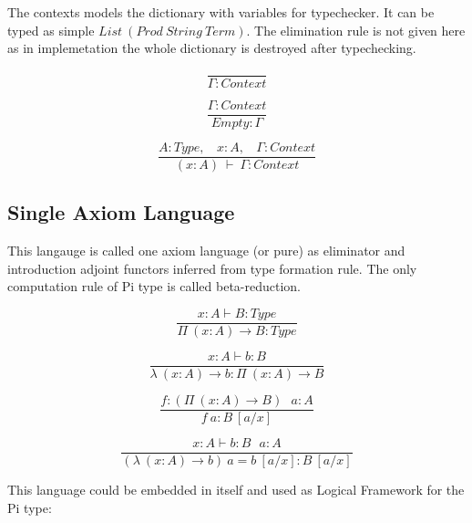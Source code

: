 \documentclass[11pt,oneside]{article}
\begin{document}
The contexts models the dictionary with variables for typechecker.
It can be typed as simple $List\ (Prod\ String\ Term)$. The elimination
rule is not given here as in implemetation the whole dictionary
is destroyed after typechecking.

\begin{equation}
\tag{S}
\dfrac
{}
{\Gamma : Context}
\end{equation}

\begin{equation}
\tag{S}
\dfrac
{\Gamma : Context}
{Empty : \Gamma}
\end{equation}

\begin{equation}
\tag{S}
\dfrac
{A : Type,\ \ \ \ x : A,\ \ \ \ \Gamma : Context}
{(x : A)\ \vdash\ \Gamma : Context}
\end{equation}

\subsection{Single Axiom Language}

This langauge is called one axiom language (or pure) as eliminator
and introduction adjoint functors inferred from type formation rule.
The only computation rule of Pi type is called beta-reduction.

\begin{equation}
\tag{$\Pi$-formation}
\dfrac
{x:A \vdash B : Type}
{\Pi\ (x:A) \rightarrow B : Type}
\end{equation}

\begin{equation}
\tag{$\lambda$-intro}
\dfrac
{x:A \vdash b : B}
{\lambda\ (x:A) \rightarrow b : \Pi\ (x: A) \rightarrow B }
\end{equation}

\begin{equation}
\tag{$App$-elimination}
\dfrac
{f: (\Pi\ (x:A) \rightarrow B)\ \ \ a: A}
{f\ a : B\ [a/x]}
\end{equation}

\begin{equation}
\tag{$\beta$-computation}
\dfrac
{x:A \vdash b: B\ \ \ a:A}
{(\lambda\ (x:A) \rightarrow b)\ a = b\ [a/x] : B\ [a/x]}
\end{equation}

\vspace{0.5cm}
This language could be embedded in itself and used
as Logical Framework for the Pi type:
\end{document}
